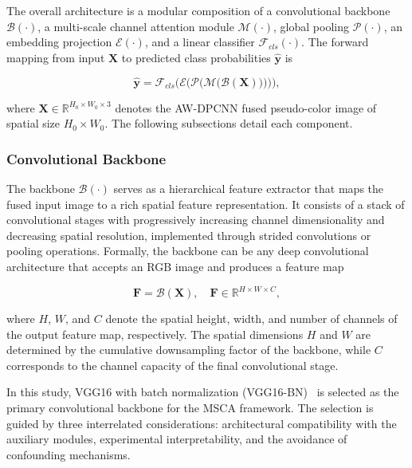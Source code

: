 \documentclass[journal]{IEEEtran}
\begin{document}
The overall architecture is a modular composition of a convolutional backbone $\mathcal{B}(\cdot)$, a multi-scale channel attention module $\mathcal{M}(\cdot)$, global pooling $\mathcal{P}(\cdot)$, an embedding projection $\mathcal{E}(\cdot)$, and a linear classifier $\mathcal{F}_{cls}(\cdot)$. The forward mapping from input $\boldsymbol{X}$ to predicted class probabilities $\hat{\mathbf{y}}$ is

\begin{equation}
\hat{\mathbf{y}} = \mathcal{F}_{cls}\big(\mathcal{E}\big(\mathcal{P}\big(\mathcal{M}\big(\mathcal{B}(\boldsymbol{X})\big)\big)\big)\big),
\label{eq:cls_pipeline}
\end{equation}

where $\boldsymbol{X} \in \mathbb{R}^{H_0 \times W_0 \times 3}$ denotes the AW-DPCNN fused pseudo-color image of spatial size $H_0 \times W_0$. The following subsections detail each component.

\subsubsection{Convolutional Backbone}

The backbone $\mathcal{B}(\cdot)$ serves as a hierarchical feature extractor that maps the fused input image to a rich spatial feature representation. It consists of a stack of convolutional stages with progressively increasing channel dimensionality and decreasing spatial resolution, implemented through strided convolutions or pooling operations. Formally, the backbone can be any deep convolutional architecture that accepts an RGB image and produces a feature map

\begin{equation}
\boldsymbol{F} = \mathcal{B}(\boldsymbol{X}), \quad \boldsymbol{F} \in \mathbb{R}^{H \times W \times C},
\label{eq:feature_map}
\end{equation}

where $H$, $W$, and $C$ denote the spatial height, width, and number of channels of the output feature map, respectively. The spatial dimensions $H$ and $W$ are determined by the cumulative downsampling factor of the backbone, while $C$ corresponds to the channel capacity of the final convolutional stage.

In this study, VGG16 with batch normalization (VGG16-BN)~\cite{zhangFaultDiagnosisRecognition2024} is selected as the primary convolutional backbone for the MSCA framework. The selection is guided by three interrelated considerations: architectural compatibility with the auxiliary modules, experimental interpretability, and the avoidance of confounding mechanisms.
\end{document}
